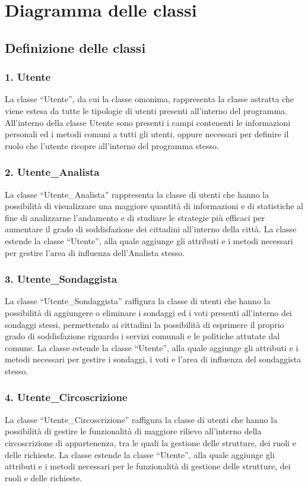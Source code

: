 \chapter{Diagramma delle classi}

\section{Definizione delle classi}

    \subsection*{1. Utente}
        La classe ``Utente'', da cui la classe omonima, rappresenta la classe astratta che viene estesa da tutte le tipologie di utenti presenti all'interno del programma. All'interno della classe Utente sono presenti i campi contenenti le informazioni personali ed i metodi comuni a tutti gli utenti, oppure necessari per definire il ruolo che l'utente ricopre all'interno del programma stesso.

    \subsection*{2. Utente\_Analista}
        La classe ``Utente\_Analista'' rappresenta la classe di utenti che hanno la possibilità di visualizzare una maggiore quantità di informazioni e di statistiche al fine di analizzarne l'andamento e di studiare le strategie più efficaci per aumentare il grado di soddisfazione dei cittadini all'interno della città. La classe estende la classe ``Utente'', alla quale aggiunge gli attributi e i metodi necessari per gestire l'area di influenza dell'Analista stesso.

    \subsection*{3. Utente\_Sondaggista}
        La classe ``Utente\_Sondaggista'' raffigura la classe di utenti che hanno la possibilità di aggiungere o eliminare i sondaggi ed i voti presenti all'interno dei sondaggi stessi, permettendo ai cittadini la possibilità di esprimere il proprio grado di soddisfazione riguardo i servizi comunali e le politiche attutate dal comune. La classe estende la classe ``Utente'', alla quale aggiunge gli attributi e i metodi necessari per gestire i sondaggi, i voti e l'area di influenza del sondaggista stesso.

    \subsection*{4. Utente\_Circoscrizione}
        La classe ``Utente\_Circoscrizione'' raffigura la classe di utenti che hanno la possibilità di gestire le funzionalità di maggiore rilievo all'interno della circoscrizione di appartenenza, tra le quali la gestione delle strutture, dei ruoli e delle richieste. La classe estende la classe ``Utente'', alla quale aggiunge gli attributi e i metodi necessari per le funzionalità di gestione delle strutture, dei ruoli e delle richieste.

